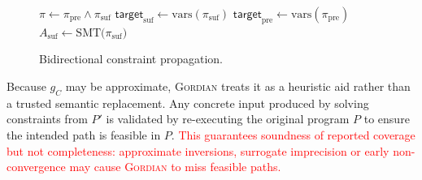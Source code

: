 \documentclass[acmsmall]{acmart}
\newcommand{\rev}[1]{\textcolor{red}{#1}}
\newcommand{\rev}[1]{#1}
\newcommand{\projName}{\textsc{Gordian}\xspace}
\theoremstyle{definition}
\begin{document}
\newpage
\addtocounter{figure}{-2}
\begin{figure}%
  \centering
  \begin{minipage}{0.47\textwidth}
  \small
  \begin{algorithm}[H]

$\pi \gets \pi_{\mathrm{pre}} \wedge \pi_{\mathrm{suf}}$\;
$\mathsf{target}_{\mathrm{suf}} \gets \mathrm{vars}(\pi_{\mathrm{suf}})$\;
$\mathsf{target}_{\mathrm{pre}} \gets \mathrm{vars}(\pi_{\mathrm{pre}})$\;
$A_{\mathrm{suf}} \gets \mathrm{SMT}\bigl(\pi_{\mathrm{suf}}\bigr)$\;

  \end{algorithm}
  \end{minipage}
\caption{Bidirectional constraint propagation.\label{alg:bidirectional_reconcile}}
\end{figure}
\addtocounter{figure}{1}%

Because \(g_C\) may be approximate, \projName treats it as a heuristic aid rather than a trusted semantic replacement. Any concrete input produced by solving constraints from \(P'\) is validated by re-executing the original program \(P\) to ensure the intended path is feasible in \(P\). \rev{This guarantees soundness of reported coverage but not completeness: approximate inversions, surrogate imprecision or early non-convergence may cause \projName{} to miss feasible paths.}
\end{document}
